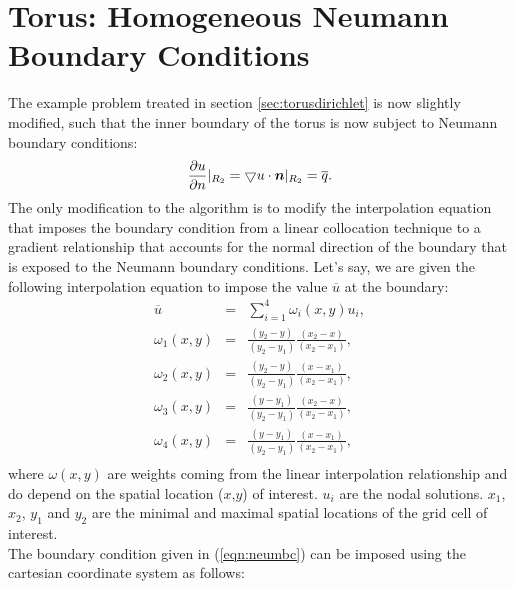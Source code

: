 \documentclass[a4paper,12pt]{article}
\newcommand{\mb}[1]{{\mbox{\boldmath$#1$\unboldmath}}}
\begin{document}
\section{Torus: Homogeneous Neumann Boundary Conditions}
The example problem treated in section \ref{sec:torusdirichlet} is now slightly modified, such that the inner boundary of the torus is now subject to Neumann boundary conditions:
\begin{equation}\label{eqn:neumbc}
 \frac{\partial u}{\partial n}\vert_{R_2} = \bigtriangledown u \cdot \mb{n}\vert_{R_2} = \overline{q}.
\end{equation}
The only modification to the algorithm is to modify the interpolation equation that imposes the boundary condition from a linear collocation technique to a gradient relationship that accounts for the normal direction of the boundary that is exposed to the Neumann boundary conditions. Let's say, we are given the following interpolation equation to impose the value $\overline{u}$ at the boundary:
\begin{eqnarray}
\overline{u}  &=& \sum_{i=1}^{4}\omega_i(x,y)u_i,\\
\omega_1(x,y) &=& \frac{(y_2 - y)}{(y_2 - y_1)}\frac{(x_2 - x)}{(x_2 - x_1)},\\
\omega_2(x,y) &=& \frac{(y_2 - y)}{(y_2 - y_1)}\frac{(x - x_1)}{(x_2 - x_1)},\\
\omega_3(x,y) &=& \frac{(y - y_1)}{(y_2 - y_1)}\frac{(x_2 - x)}{(x_2 - x_1)},\\
\omega_4(x,y) &=& \frac{(y - y_1)}{(y_2 - y_1)}\frac{(x - x_1)}{(x_2 - x_1)},\\ 
\end{eqnarray}
where $\omega(x,y)$ are weights coming from the linear interpolation relationship and do depend on the spatial location ($x$,$y$) of interest. $u_i$ are the nodal solutions. $x_1$, $x_2$, $y_1$ and $y_2$ are the minimal and maximal spatial locations of the grid cell of interest.\\
The boundary condition given in (\ref{eqn:neumbc}) can be imposed using the cartesian coordinate system as follows:
\end{document}
